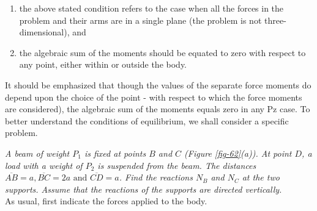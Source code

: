 \documentclass[a4paper,sfsidenotes]{tufte-book}
\begin{document}
\begin{enumerate}[label=(\arabic*), leftmargin=1cm]
\item the above stated condition refers to the case when all the forces in the problem and their arms are in a single plane (the problem is not three-dimensional), and
\item the algebraic sum of the moments should be equated to zero with respect to any point, either within or outside the body. 
\end{enumerate}

It should be emphasized that though the values of the separate force moments do depend upon
the choice of the point - with respect to which the force moments are considered), the algebraic sum of the moments equals zero in any Pz case. To better understand the conditions of equilibrium, we shall consider a specific problem. 

\emph{A beam of weight $P_{1}$ is fixed at points $B$ and $C$ (\emph{Figure \ref{fig-62}(a)}). At point $D$, a load with a weight of $P_{2}$ is suspended from the beam. The distances $\overline{AB}=a,
\overline{BC}=2a \,\, \text{and}\,\, \overline{CD}=a$. Find the reactions $N_{B}$ and $N_{C}$ at the two supports. Assume that the reactions of the supports are directed vertically.} 
\\
As usual, first indicate the forces applied to the body.
 
\end{document}
